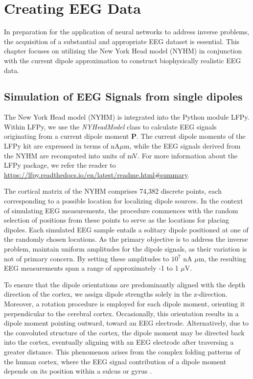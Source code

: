 \documentclass[a4paper, UKenglish, 11pt]{uiomaster}
\begin{document}
\chapter{Creating EEG Data}
In preparation for the application of neural networks to address inverse problems, the acquisition of a substantial and appropriate EEG dataset is essential. This chapter focuses on utilizing the New York Head model (NYHM) in conjunction with the current dipole approximation to construct biophysically realistic EEG data.

\section{Simulation of EEG Signals from single dipoles}
The New York Head model (NYHM) is integrated into the Python module LFPy. Within LFPy, we use the \emph{NYHeadModel} class to calculate EEG signals originating from a current dipole moment $\textbf{P}$. The current dipole moments of the LFPy kit are expressed in terms of nA$\mu$m, while the EEG signals derived from the NYHM are recomputed into units of mV. For more information about the LFPy package, we refer the reader to \url{https://lfpy.readthedocs.io/en/latest/readme.html#summary}.

The cortical matrix of the NYHM comprises 74,382 discrete points, each corresponding to a possible location for localizing dipole sources. In the context of simulating EEG measurements, the procedure commences with the random selection of positions from these points to serve as the locations for placing dipoles. Each simulated EEG sample entails a solitary dipole positioned at one of the randomly chosen locations. As the primary objective is to address the inverse problem, maintain uniform amplitudes for the dipole signals, as their variation is not of primary concern. By setting these amplitudes to $10^7$ nA $\mu$m, the resulting EEG measurements span a range of approximately -1 to 1 $\mu$V.

To ensure that the dipole orientations are predominantly aligned with the depth direction of the cortex, we assign dipole strengths solely in the z-direction. Moreover, a rotation procedure is employed for each dipole moment, orienting it perpendicular to the cerebral cortex. Occasionally, this orientation results in a dipole moment pointing outward, toward an EEG electrode. Alternatively, due to the convoluted structure of the cortex, the dipole moment may be directed back into the cortex, eventually aligning with an EEG electrode after traversing a greater distance. This phenomenon arises from the complex folding patterns of the human cortex, where the EEG signal contribution of a dipole moment depends on its position within a sulcus or gyrus \cite{naess2021biophysically}.
\end{document}
